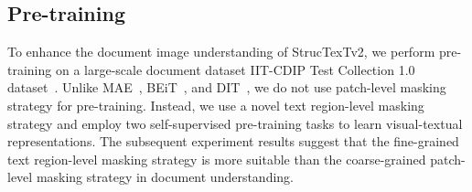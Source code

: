 \documentclass{article} %
\begin{document}


\subsection{Pre-training}

To enhance the document image understanding of StrucTexTv2, we perform pre-training on a large-scale document dataset IIT-CDIP Test Collection 1.0 dataset~\cite{sigir06cdip}. Unlike MAE~\cite{he2021masked}, BEiT~\cite{bao2021beit}, and DIT~\cite{li2022dit}, we do not use patch-level masking strategy for pre-training. Instead, we use a novel text region-level masking strategy and employ two self-supervised pre-training tasks to learn visual-textual representations. The subsequent experiment results suggest that the fine-grained text region-level masking strategy is more suitable than the coarse-grained patch-level masking strategy in document understanding.
\end{document}
